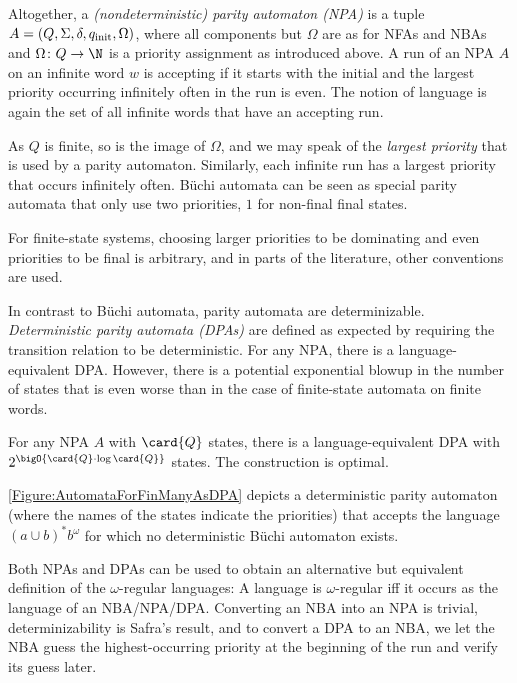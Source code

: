 \documentclass[../../diss.tex]{subfiles}
\begin{document}
Altogether, a \emph{(nondeterministic) parity automaton (NPA)} is a tuple
$A = (Q, \Sigma, \delta, q_{\text{init}}, \Omega)$, where all components but $\Omega$ are as for NFAs and NBAs and $\Omega \colon Q \to \N$ is a priority assignment as introduced above.
A run of an NPA $A$ on an infinite word $w$ is accepting if it starts with the initial  and the largest priority occurring infinitely often in the run is even.
The notion of language is again the set of all infinite words that have an accepting run.

As $Q$ is finite, so is the image of $\Omega$, and we may speak of the \emph{largest priority} that is used by a parity automaton.
Similarly, each infinite run has a largest priority that occurs infinitely often.
Büchi automata can be seen as special parity automata that only use two priorities, $1$ for non-final  final states.

\begin{remark*}
    For finite-state systems, choosing larger priorities to be dominating and even priorities to be final is arbitrary, and in parts of the literature, other conventions are used.
\end{remark*}

In contrast to Büchi automata, parity automata are determinizable.
\emph{Deterministic parity automata (DPAs)} are defined as expected by requiring the transition relation to be deterministic.
For any NPA, there is a language-equivalent DPA.\@
However, there is a potential exponential blowup in the number of states that is even worse than in the case of finite-state automata on finite words.

\begin{theorem}
    For any NPA $A$ with $\card{Q}$ states, there is a language-equivalent DPA with $2^{\bigO{\card{Q} \cdot \log \card{Q}}}$ states.
    The construction is optimal.
\end{theorem}

\cref{Figure:AutomataForFinManyAsDPA} depicts a deterministic parity automaton (where the names of the states indicate the priorities) that accepts the language ${(a \cup b)}^* b^\omega$ for which no deterministic Büchi automaton exists.

Both NPAs and DPAs can be used to obtain an alternative but equivalent definition of the $\omega$-regular languages:
A language is $\omega$-regular iff it occurs as the language of an NBA/NPA/DPA.\@
Converting an NBA into an NPA is trivial, determinizability is Safra's result, and to convert a DPA to an NBA, we let the NBA guess the highest-occurring priority at the beginning of the run and verify its guess later.
\end{document}
